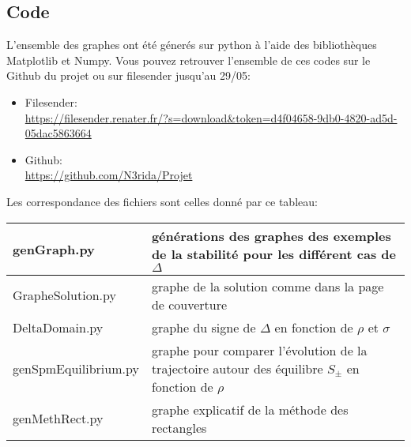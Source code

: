 \documentclass{article}
\newtheorem[M , nocut]{prop}{Proposition}[section]
\newtheorem[S , nocut]{definition}{Définition}
\newtheorem[S , nocut]{lemme}{Lemme}
\newtheorem[L , nocut]{thm}{Théoreme}
\newtheorem[L , nocut]{cor}{Corollaire}
\begin{document}
\subsection*{Code}
L'ensemble des graphes ont été génerés sur python à l'aide des bibliothèques Matplotlib et Numpy. Vous pouvez retrouver l'ensemble de ces codes sur le Github du projet ou sur filesender jusqu'au 29/05:
\begin{itemize}
    \item Filesender:\\ \url{https://filesender.renater.fr/?s=download&token=d4f04658-9db0-4820-ad5d-05dac5863664}
    \item Github:\\ \url{https://github.com/N3rida/Projet}
\end{itemize}
Les correspondance des fichiers sont celles donné par ce tableau:\\
\begin{tabular}{|m{}|m{}|}
    \hline
    genGraph.py & générations des graphes des exemples de la stabilité pour les différent cas de $\Delta$\\
    \hline
    GrapheSolution.py & graphe de la solution comme dans la page de couverture\\
    \hline
    DeltaDomain.py & graphe du signe de $\Delta$ en fonction de $\rho$ et $\sigma$\\
    \hline
    genSpmEquilibrium.py & graphe pour comparer l'évolution de la trajectoire autour des équilibre $S_\pm$ en fonction de $\rho$\\
    \hline
    genMethRect.py & graphe explicatif de la méthode des rectangles\\
    \hline
\end{tabular}

\newpage
\nocite{*}
\printbibliography[heading=bibintoc,title={Bibliographie}]
\end{document}
